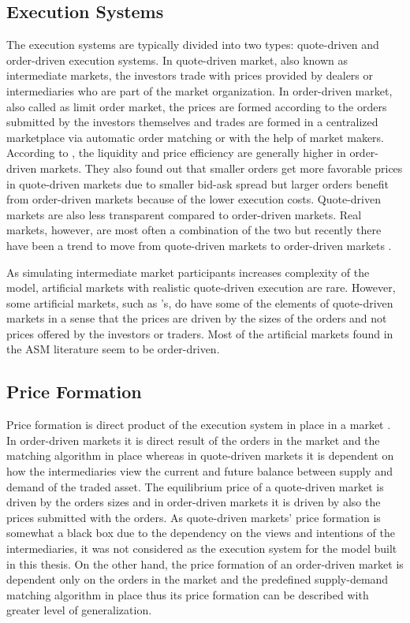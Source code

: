 \subsection{Execution Systems}
The execution systems are typically divided into two types:
quote-driven and order-driven execution systems. In quote-driven market, also known
as intermediate markets, the investors trade with prices provided 
by dealers or intermediaries who are part of the market organization. 
In order-driven market, also called as limit order market, 
the prices are formed according to the orders submitted by the 
investors themselves and trades are formed in a centralized marketplace 
via automatic order matching or with the help of market makers. 
\citep{Baru17} According to \citet{MALINOVA2013104},
the liquidity and price efficiency are generally higher in order-driven 
markets. They also found out that smaller orders get more favorable prices in 
quote-driven markets due to smaller bid-ask spread 
but larger orders benefit from order-driven markets because of the lower 
execution costs. Quote-driven markets are also less transparent compared
to order-driven markets. Real markets, however, are most often a combination
of the two \citep{boer05} but recently there have been a trend to move from quote-driven
markets to order-driven markets \citep{MALINOVA2013104}.

As simulating intermediate market participants increases complexity
of the model, artificial markets with realistic quote-driven execution are rare. 
However, some artificial markets, such as \citet{SantaFe99}'s, do have some of 
the elements of quote-driven markets in a sense that the prices are driven by 
the sizes of the orders and not prices offered by the investors or traders. 
Most of the artificial markets found in the ASM literature seem to be order-driven.

\subsection{Price Formation}
Price formation is direct product of the execution system in place in a market
\citep{boer05}. In order-driven markets it is direct result of the orders
in the market and the matching algorithm in place whereas in quote-driven markets it
is dependent on how the intermediaries view the current and future 
balance between supply and demand of the traded asset. The equilibrium price of a 
quote-driven market is driven by the orders sizes and in order-driven markets
it is driven by also the prices submitted with the orders. \citep{MALINOVA2013104}
As quote-driven markets' price formation is somewhat a black box due to the 
dependency on the views and intentions of the intermediaries, it was not considered
as the execution system for the model built in this thesis. On the other hand, 
the price formation of an order-driven market is dependent only on the orders in the
market and the predefined supply-demand matching algorithm in place thus its price 
formation can be described with greater level of generalization.

